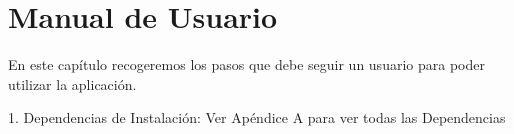 \chapter{Manual de Usuario}
\label{cap:descripcionTrabajo}

En este capítulo recogeremos los pasos que debe seguir un usuario para poder utilizar la aplicación.

1. Dependencias de Instalación:
	Ver Apéndice A para ver todas las Dependencias
